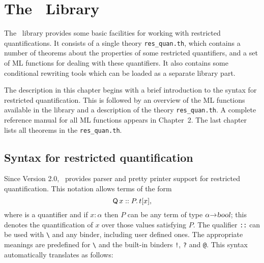 
\chapter{The \resquan\ Library}

The \resquan\ library provides some basic facilities for working with
restricted quantifications. It consists of a single theory \verb|res_quan.th|,
which contains a number of theorems about the properties of some
restricted quantifiers, and a set of ML functions for dealing with
these quantifiers. It also contains some conditional
rewriting tools which can be loaded as a separate library part.

The description in this chapter begins with a brief introduction to
the syntax for restricted quantification. This is followed by an
overview of the ML functions available in the library and a
description of the theory \verb|res_quan.th|. A complete reference
manual for all ML functions appears in Chapter~2. The last chapter
lists all theorems in the \verb|res_quan.th|.

\section{Syntax for restricted quantification}

Since Version 2.0, \HOL\ provides parser and pretty printer support
for restricted quantification. This notation allows terms of the form
\[
{\sf Q}\,x ::P.\, t[x],
\]
where  is a quantifier and
if $x:\alpha$ then $P$ can be any term of type $\alpha{\to}\textsl{bool}$; this
denotes the quantification of $x$ over those values satisfying $P$.
The qualifier {\small\verb|::|} can be used with {\small\verb|\|} and any
binder, including user defined ones. The appropriate meanings are
predefined for {\small\verb|\|} and the built-in binders 
{\small\verb|!|}, {\small\verb|?|} and {\small\verb|@|}. 
This syntax automatically translates as follows:

\begin{hol}
{\small\verb%   \%}$v${\small\verb%::%}$P${\small\verb%.%}$tm${\small\verb%    <---->   %}\con{RES\_ABSTRACT}\ $P${\small\verb% (\%}$v${\small\verb%.%}$tm${\small\verb%)%}\\
{\small\verb%   !%}$v${\small\verb%::%}$P${\small\verb%.%}$tm${\small\verb%    <---->   %}\con{RES\_FORALL}\ \ \ $P${\small\verb% (\%}$v${\small\verb%.%}$tm${\small\verb%)%}\\
{\small\verb%   ?%}$v${\small\verb%::%}$P${\small\verb%.%}$tm${\small\verb%    <---->   %}\con{RES\_EXISTS}\ \ \ $P${\small\verb% (\%}$v${\small\verb%.%}$tm${\small\verb%)%}\\
{\small\verb%   @%}$v${\small\verb%::%}$P${\small\verb%.%}$tm${\small\verb%    <---->   %}\con{RES\_SELECT}\ \ \ $P${\small\verb% (\%}$v${\small\verb%.%}$tm${\small\verb%)%}
\end{hol}

